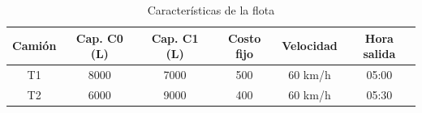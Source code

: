 \begin{table}[H]
\centering
\caption{Características de la flota}
\begin{tabular}{cccccc}
\toprule
Camión & Cap. C0 (L) & Cap. C1 (L) & Costo fijo & Velocidad & Hora salida \\
\midrule
T1 & 8000 & 7000 & 500 & 60 km/h & 05:00 \\
T2 & 6000 & 9000 & 400 & 60 km/h & 05:30 \\
\bottomrule
\end{tabular}
\end{table}